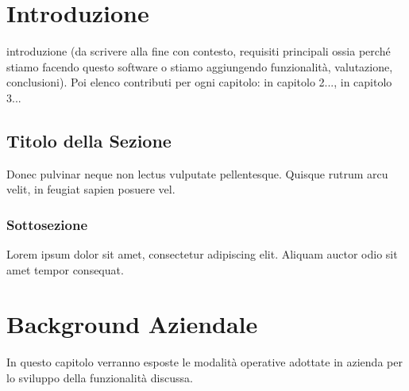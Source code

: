 \documentclass[target=bach,aauheader=,style=]{thud}
\begin{document}
\chapter{Introduzione}

introduzione (da scrivere alla fine con contesto, requisiti principali ossia perché stiamo facendo questo software o
stiamo aggiungendo funzionalità, valutazione, conclusioni). Poi elenco contributi per ogni capitolo:
in capitolo 2..., in capitolo 3...

\section{Titolo della Sezione}
Donec pulvinar neque non lectus vulputate pellentesque. Quisque rutrum arcu velit, in feugiat sapien posuere vel.

\subsection{Sottosezione}

Lorem ipsum dolor sit amet, consectetur adipiscing elit. Aliquam auctor odio sit amet tempor consequat.

\chapter{Background Aziendale}

In questo capitolo verranno esposte le modalità operative adottate in azienda per lo sviluppo della funzionalità discussa.
\end{document}
